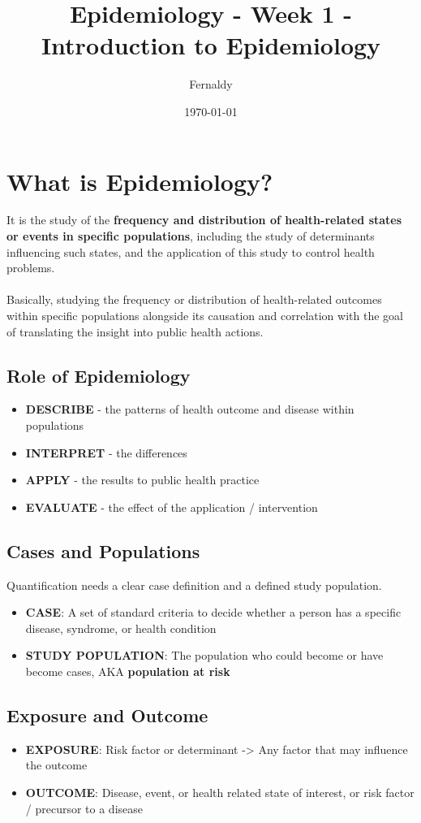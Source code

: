 \documentclass{article}
\title{Epidemiology - Week 1 - Introduction to Epidemiology}
\author{Fernaldy}
\date{\today}
\begin{document}
\maketitle

\section*{What is Epidemiology?}
It is the study of the \textbf{frequency and distribution of health-related states or events in specific populations},
including the study of determinants influencing such states, and the application of this study to control health problems.
\\~\\
Basically, studying the frequency or distribution of health-related outcomes within specific populations
alongside its causation and correlation with the goal of translating the insight into public health actions.

\subsection*{Role of Epidemiology}
\begin{itemize}
    \item \textbf{DESCRIBE} - the patterns of health outcome and disease within populations
    \item \textbf{INTERPRET} - the differences
    \item \textbf{APPLY} - the results to public health practice
    \item \textbf{EVALUATE} - the effect of the application / intervention
\end{itemize}

\subsection*{Cases and Populations}
Quantification needs a clear case definition and a defined study population.
\begin{itemize}
    \item \textbf{CASE}: A set of standard criteria to decide whether a person has a specific disease, syndrome, or health condition
    \item \textbf{STUDY POPULATION}: The population who could become or have become cases, AKA \textbf{population at risk}
\end{itemize}

\subsection*{Exposure and Outcome}
\begin{itemize}
    \item \textbf{EXPOSURE}: Risk factor or determinant -> Any factor that may influence the outcome
    \item \textbf{OUTCOME}: Disease, event, or health related state of interest, or risk factor / precursor to a disease
\end{itemize}
\end{document}
